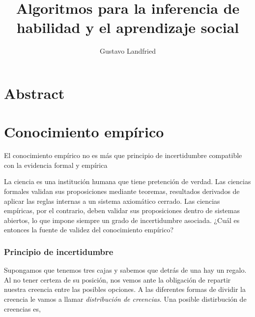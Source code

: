 \documentclass[a4paper,10pt]{book}
\title{\huge Algoritmos para la inferencia de habilidad y el aprendizaje social}
\author{Gustavo Landfried}
\theoremstyle{definition}
\begin{document}
\maketitle

\tableofcontents

\chapter*{Abstract}


\chapter{Conocimiento empírico}

\epigraph{El conocimiento empírico no es más que principio de incertidumbre compatible con la evidencia formal y empírica}{}

La ciencia es una institución humana que tiene pretención de verdad.
Las ciencias formales validan sus proposiciones mediante teoremas, resultados derivados de aplicar las reglas internas a un sistema axiomático cerrado.
Las ciencias empíricas, por el contrario, deben validar sus proposiciones dentro de sistemas abiertos, lo que impone siempre un grado de incertidumbre asociada.
¿Cuál es entonces la fuente de validez del conocimiento empírico?

\subsection{Principio de incertidumbre}

Supongamos que tenemos tres cajas y sabemos que detrás de una hay un regalo.
Al no tener certeza de su posición, nos vemos ante la obligación de repartir nuestra creencia entre las posibles opciones.
A las diferentes formas de dividir la creencia le vamos a llamar \emph{distribución de creencias}.
Una posible distirbución de creencias es,

\begin{figure}[H]
\centering
{} 
\end{figure}
\end{document}
